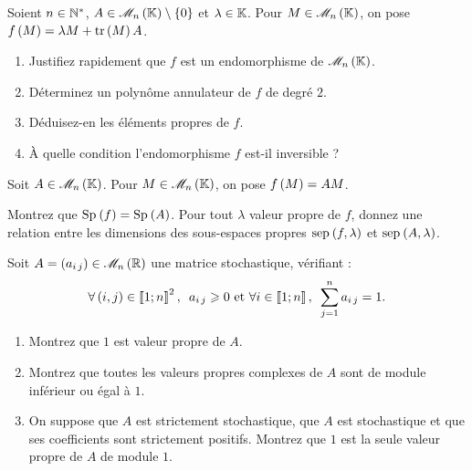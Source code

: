 \begin{corr}
\end{corr}

\begin{exoss}[Exercice 3]
Soient \(n\in\mathbb{N}^*\), \(A\in\M{n}\excluant\accol{0}\) et \(\lambda\in\mathbb{K}\). Pour \(M\in\M{n}\), on pose \(f\left(M\right)=\lambda M+\operatorname{tr}\left(M\right)A\).

\begin{enumerate}
    \item Justifiez rapidement que \(f\) est un endomorphisme de \(\M{n}\). \\
    \item Déterminez un polynôme annulateur de \(f\) de degré \(2\). \\
    \item Déduisez-en les éléments propres de \(f\). \\
    \item À quelle condition l'endomorphisme \(f\) est-il inversible ?
\end{enumerate}
\end{exoss}

\begin{corr}
\end{corr}

\begin{exoss}[Exercice 4]
Soit \(A\in\M{n}\). Pour \(M\in\M{n}\), on pose \(f\left(M\right)=AM\).

Montrez que \(\Sp{f}=\Sp{A}\). Pour tout \(\lambda\) valeur propre de \(f\), donnez une relation entre les dimensions des sous-espaces propres \(\sep{f}{\lambda}\) et \(\sep{A}{\lambda}\).
\end{exoss}

\begin{corr}
\end{corr}

\begin{exoss}
Soit \(A=\paren{a_{i\,j}}\in\M{n}[\R]\) une matrice stochastique, \cad vérifiant : \[\quantifs{\forall\paren{i,j}\in\interventierii{1}{n}^2}a_{i\,j}\geq0\text{ et }\quantifs{\forall i\in\interventierii{1}{n}}\sum_{j=1}^na_{i\,j}=1.\]

\begin{enumerate}
    \item Montrez que \(1\) est valeur propre de \(A\). \\
    \item Montrez que toutes les valeurs propres complexes de \(A\) sont de module inférieur ou égal à \(1\). \\
    \item On suppose que \(A\) est strictement stochastique, \cad que \(A\) est stochastique et que ses coefficients sont strictement positifs. Montrez que \(1\) est la seule valeur propre de \(A\) de module \(1\).
\end{enumerate}
\end{exoss}

